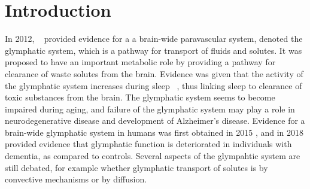 \documentclass[11pt,a4paper]{article}
\begin{document}
\section{Introduction}
In 2012, ~\citet{iliff2012paravascular} provided evidence for a a brain-wide paravascular system, denoted the glymphatic system, which is a pathway for transport of fluids and solutes. It was proposed to have an important metabolic role by providing a pathway for clearance of waste solutes from the brain. Evidence was given that the activity of the glymphatic system increases during sleep ~\citet{xie2013sleep}, thus linking sleep to clearance of toxic substances from the brain. The glymphatic system seems to become impaired during aging, and failure of the glymphatic system may play a role in neurodegenerative disease and development of Alzheimer's disease. Evidence for a brain-wide glymphatic system in humans was first obtained in 2015 \citet{eide2015mri}, and in 2018 \citet{ringstad2018brain} provided evidence that glymphatic function is deteriorated in individuals with dementia, as compared to controls.
Several aspects of the glympahtic system are still debated, for example whether glymphatic transport of solutes is by convective mechanisms or by diffusion.

\end{document}
